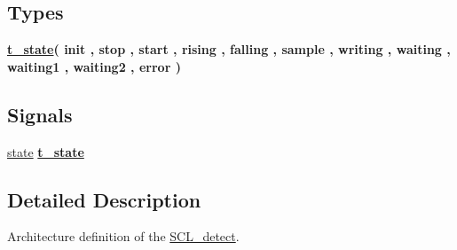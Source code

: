 \subsection*{Types}
 \begin{DoxyCompactItemize}
\item 
{\bfseries \hyperlink{class_s_c_l__detect_1_1fsm_a5653729522f0b754a9aa9312cc16b167}{t\+\_\+state}{\bfseries \textcolor{vhdlchar}{(}\textcolor{vhdlchar}{ }\textcolor{vhdlchar}{init}\textcolor{vhdlchar}{ }\textcolor{vhdlchar}{,}\textcolor{vhdlchar}{ }\textcolor{vhdlchar}{stop}\textcolor{vhdlchar}{ }\textcolor{vhdlchar}{,}\textcolor{vhdlchar}{ }\textcolor{vhdlchar}{start}\textcolor{vhdlchar}{ }\textcolor{vhdlchar}{,}\textcolor{vhdlchar}{ }\textcolor{vhdlchar}{rising}\textcolor{vhdlchar}{ }\textcolor{vhdlchar}{,}\textcolor{vhdlchar}{ }\textcolor{vhdlchar}{falling}\textcolor{vhdlchar}{ }\textcolor{vhdlchar}{,}\textcolor{vhdlchar}{ }\textcolor{vhdlchar}{sample}\textcolor{vhdlchar}{ }\textcolor{vhdlchar}{,}\textcolor{vhdlchar}{ }\textcolor{vhdlchar}{writing}\textcolor{vhdlchar}{ }\textcolor{vhdlchar}{,}\textcolor{vhdlchar}{ }\textcolor{vhdlchar}{waiting}\textcolor{vhdlchar}{ }\textcolor{vhdlchar}{,}\textcolor{vhdlchar}{ }\textcolor{vhdlchar}{waiting1}\textcolor{vhdlchar}{ }\textcolor{vhdlchar}{,}\textcolor{vhdlchar}{ }\textcolor{vhdlchar}{waiting2}\textcolor{vhdlchar}{ }\textcolor{vhdlchar}{,}\textcolor{vhdlchar}{ }\textcolor{vhdlchar}{error}\textcolor{vhdlchar}{ }\textcolor{vhdlchar}{)}\textcolor{vhdlchar}{ }}} 
\end{DoxyCompactItemize}
\subsection*{Signals}
 \begin{DoxyCompactItemize}
\item 
\hyperlink{class_s_c_l__detect_1_1fsm_a3faeb1655b4935d9040ff50adfdcd5f0}{state} {\bfseries {\bfseries \hyperlink{class_s_c_l__detect_1_1fsm_a5653729522f0b754a9aa9312cc16b167}{t\+\_\+state}} \textcolor{vhdlchar}{ }} \hypertarget{class_s_c_l__detect_1_1fsm_a3faeb1655b4935d9040ff50adfdcd5f0}{}\label{class_s_c_l__detect_1_1fsm_a3faeb1655b4935d9040ff50adfdcd5f0}

\end{DoxyCompactItemize}


\subsection{Detailed Description}
Architecture definition of the \hyperlink{class_s_c_l__detect}{S\+C\+L\+\_\+detect}. 

